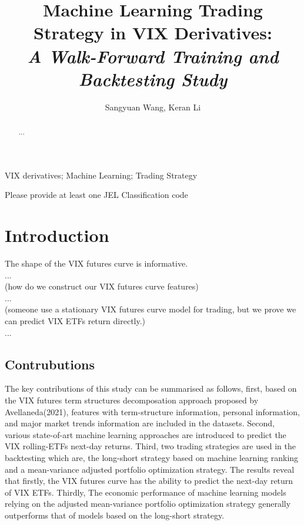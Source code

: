 \documentclass{rQUF2e}
\theoremstyle{plain}
\theoremstyle{definition}
\theoremstyle{remark}
\begin{document}

\title{Machine Learning Trading Strategy in VIX Derivatives:\\{\textit{A Walk-Forward Training and Backtesting Study
}}}

\author{Sangyuan Wang, Keran Li}

\maketitle

\begin{abstract}
...
\end{abstract}

\begin{keywords}
VIX derivatives; Machine Learning; Trading Strategy 
\end{keywords}

\begin{classcode}Please provide at least one JEL Classification code\end{classcode}


\section{Introduction}
The shape of the VIX futures curve is informative.\\
...\\
(how do we construct our VIX futures curve features)\\
...\\
(someone use a stationary VIX futures curve model for trading, but we prove we can predict VIX ETFs return directly.)\\
...\\

\subsection{Contrubutions}
The key contributions of this study can be summarised as follows, first, based on the VIX futures term structures decomposation approach proposed by Avellaneda(2021), features with term-structure information, personal information, and major market trends information are included in the datasets. Second, various state-of-art machine learning approaches are introduced to predict the VIX rolling-ETFs next-day returns. Third, two trading strategies are used in the backtesting which are, the long-short strategy based on machine learning ranking and a mean-variance adjusted portfolio optimization strategy.
The results reveal that firstly, the VIX futures curve has the ability to predict the next-day return of VIX ETFs. Thirdly, The economic performance of machine learning models relying on the adjusted mean-variance portfolio optimization strategy generally outperforms that of models based on the long-short strategy.
\end{document}
